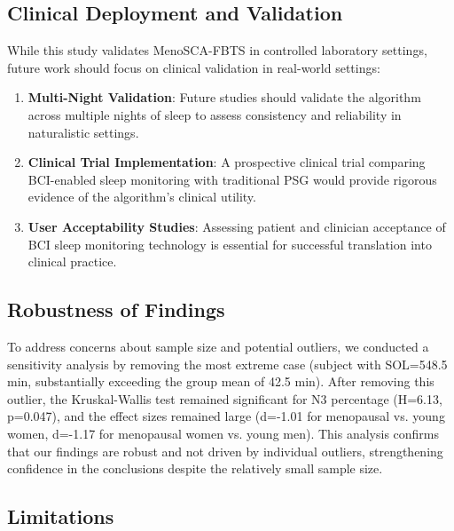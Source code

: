 \documentclass[a4paper,fleqn]{cas-dc}
\begin{document}
\subsection{Clinical Deployment and Validation}

While this study validates MenoSCA-FBTS in controlled laboratory settings, future work should focus on clinical validation in real-world settings:

\begin{enumerate}
\item \textbf{Multi-Night Validation}: Future studies should validate the algorithm across multiple nights of sleep to assess consistency and reliability in naturalistic settings.
\item \textbf{Clinical Trial Implementation}: A prospective clinical trial comparing BCI-enabled sleep monitoring with traditional PSG would provide rigorous evidence of the algorithm's clinical utility.
\item \textbf{User Acceptability Studies}: Assessing patient and clinician acceptance of BCI sleep monitoring technology is essential for successful translation into clinical practice.
\end{enumerate}

\subsection{Robustness of Findings}

To address concerns about sample size and potential outliers, we conducted a sensitivity analysis by removing the most extreme case (subject with SOL=548.5 min, substantially exceeding the group mean of 42.5 min). After removing this outlier, the Kruskal-Wallis test remained significant for N3 percentage (H=6.13, p=0.047), and the effect sizes remained large (d=-1.01 for menopausal vs. young women, d=-1.17 for menopausal women vs. young men). This analysis confirms that our findings are robust and not driven by individual outliers, strengthening confidence in the conclusions despite the relatively small sample size.

\subsection{Limitations}
\end{document}
